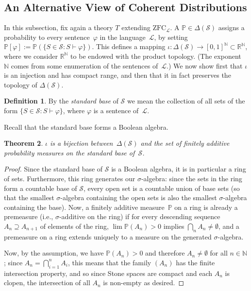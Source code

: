 \documentclass[12pt]{article}
\newcommand{\PP}{\mathbb{P}}
\newcommand{\vp}{\varphi}
\newcommand{\RR}{\mathbb{R}}
\newcommand{\NN}{\mathbb{N}}
\newcommand{\zfc}{\mathrm{ZFC}}
\newcommand{\zfcl}{{\zfc_\cL}}
\newcommand{\cL}{\mathcal{L}}
\newcommand{\cS}{\mathcal{S}}
\theoremstyle{plain}
\newtheorem{theorem}{Theorem}[subsection]
\theoremstyle{definition}
\newtheorem{definition}[theorem]{Definition}
\theoremstyle{remark}
\begin{document}
\subsection{An Alternative View of Coherent Distributions} \label{An Alternative View of Coherent Distributions}
In this subsection, fix again a theory $T$ extending $\zfcl$.
A $\PP\in\Delta(\cS)$ assigns a probability to every sentence~$\vp$ in the language~$\cL$, by setting $\PP[\vp] := \PP(\{S\in\cS:S\vdash\vp\})$. This defines a mapping $\iota : \Delta(\cS)\to [0,1]^\NN\subset\RR^\NN$, where we consider $\RR^\NN$ to be endowed with the product topology. (The exponent~$\NN$ comes from some enumeration of the sentences of~$\cL$.) We now show first that $\iota$ is an injection and has compact range, and then that it in fact preserves the topology of $\Delta(\cS)$.
\begin{definition}
By the \emph{standard base} of $\cS$ we mean the collection of all sets of the form $\{S\in\cS : S\vdash\vp\}$, where $\vp$ is a sentence of~$\cL$.
\end{definition}
Recall that the standard base forms a Boolean algebra.
\begin{theorem}
$\iota$ is a bijection between~$\Delta(\cS)$ and the set of finitely additive probability measures on the standard base of~$\cS$.
\end{theorem}
\begin{proof}
Since the standard base of $\cS$ is a Boolean algebra, it is in particular a ring of sets. Furthermore, this ring generates our $\sigma$-algebra: since the sets in the ring form a countable base of $\cS$, every open set is a countable union of base sets (so that the smallest $\sigma$-algebra containing the open sets is also the smallest $\sigma$-algebra containing the base).
Now, a finitely additive measure~$\PP$ on a ring is already a premeasure (i.e., $\sigma$-additive on the ring) if for every descending sequence $A_n\supseteq A_{n+1}$ of elements of the ring, $\lim \PP(A_n) > 0$ implies $\textstyle\bigcap_n A_n \neq\emptyset$, and a premeasure on a ring extends uniquely to a measure on the generated $\sigma$-algebra. 

Now, by the assumption, we have $\PP(A_n) > 0$ and therefore $A_n\neq\emptyset$ for all $n\in\mathbb{N}$; since $\textstyle A_n = \bigcap_{i=1}^n A_i$, this means that the family $(A_n)$ has the finite intersection property, and so since Stone spaces are compact and each $A_n$ is clopen, the intersection of all $A_n$ is non-empty as desired.
\end{proof}
\end{document}
